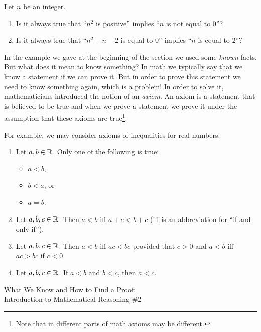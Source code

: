 \begin{exercise}
  Let $n$ be an integer.
  \begin{enumerate}
    \item Is it always true that ``$n^2$ is positive''
      implies ``$n$ is not equal to $0$''?
    \item Is it always true that ``$n^2 - n - 2$ is equal to $0$'' implies
      ``$n$ is equal to $2$''?
  \end{enumerate}
\end{exercise}
In the example we gave at the beginning of the section we used some
\textit{known} facts. But what does it mean to know something? In math we
typically say that we know a statement if we can prove it. But in order to prove
this statement we need to know something again, which is a problem! In order to
solve it, mathematicians introduced the notion of an \textit{axiom}.
An axiom is a statement that is believed to be true and when we prove a statement
we prove it under the assumption that these axioms are true\footnote{Note that
in different parts of math axioms may be different.}.

For example, we may consider axioms of inequalities for real numbers.
\begin{enumerate}
  \item Let $a, b \in \mathbb{R}$. Only one of the following is true:
    \begin{itemize}
      \item $a < b$,
      \item $b < a$, or
      \item $a = b$.
    \end{itemize}
  \item Let $a, b, c \in \mathbb{R}$. Then $a < b$ iff $a + c < b + c$ (iff is an
    abbreviation for ``if and only if'').
  \item Let $a, b, c \in \mathbb{R}$. Then $a < b$ iff $ac < bc$ provided
    that $c > 0$ and $a < b$ iff $ac > bc$ if $c < 0$.
  \item Let $a, b, c \in \mathbb{R}$. If $a < b$ and $b < c$, then $a < c$.
\end{enumerate}


\begin{marginfigure}
  {\scriptsize What We Know and How to Find a Proof:\\\noindent
  Introduction to Mathematical Reasoning \#2}
  \vskip 0.25cm
  \noindent
  \vskip 0.25cm
  \noindent
\end{marginfigure}


